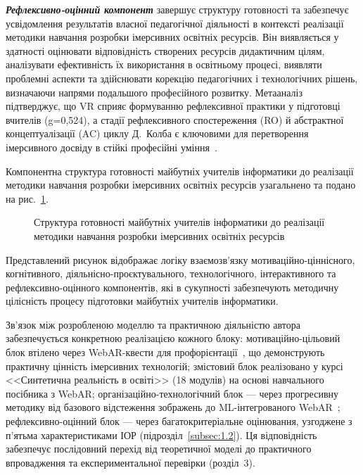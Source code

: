 \emph{\textbf{Рефлексивно-оцінний компонент}} завершує структуру готовності та забезпечує усвідомлення результатів власної педагогічної діяльності в контексті реалізації методики навчання розробки імерсивних освітніх ресурсів. Він виявляється у здатності оцінювати відповідність створених ресурсів дидактичним цілям, аналізувати ефективність їх використання в освітньому процесі, виявляти проблемні аспекти та здійснювати корекцію педагогічних і технологічних рішень, визначаючи напрями подальшого професійного розвитку. Метааналіз~\cite{Han2025VRTeacherEd} підтверджує, що VR сприяє формуванню рефлексивної практики у підготовці вчителів (g=0,524), а стадії рефлексивного спостереження (RO) й абстрактної концептуалізації (AC) циклу Д.~Колба є ключовими для перетворення імерсивного досвіду в стійкі професійні уміння~\cite{Kee2023Experiential}.

Компонентна структура готовності майбутніх учителів інформатики до реалізації методики навчання розробки імерсивних освітніх ресурсів узагальнено та подано на рис.~\ref{fig:2.4}.

\begin{figure}[!h]
\centering

\caption{Структура готовності майбутніх учителів інформатики до реалізації методики навчання розробки імерсивних освітніх ресурсів}
\label{fig:2.4}
\end{figure}

Представлений рисунок відображає логіку взаємозв'язку мотиваційно-ціннісного, когнітивного, діяльнісно-проєктувального, технологічного, інтерактивного та рефлексивно-оцінного компонентів, які в сукупності забезпечують методичну цілісність процесу підготовки майбутніх учителів інформатики.

Зв'язок між розробленою моделлю та практичною діяльністю автора забезпечується конкретною реалізацією кожного блоку: мотиваційно-цільовий блок втілено через WebAR-квести для профорієнтації~\cite{Shepiliev2021Career}, що демонструють практичну цінність імерсивних технологій; змістовий блок реалізовано у курсі <<Синтетична реальність в освіті>> (18 модулів) на основі навчального посібника з WebAR; організаційно-технологічний блок --- через прогресивну методику від базового відстеження зображень до ML-інтегрованого WebAR~\cite{Semerikov2024WebARML_CoSinE, Semerikov2024WebAR_EduDim}; рефлексивно-оцінний блок --- через багатокритеріальне оцінювання, узгоджене з п'ятьма характеристиками ІОР (підрозділ~\ref{subsec:1.2}). Ця відповідність забезпечує послідовний перехід від теоретичної моделі до практичного впровадження та експериментальної перевірки (розділ~3).

